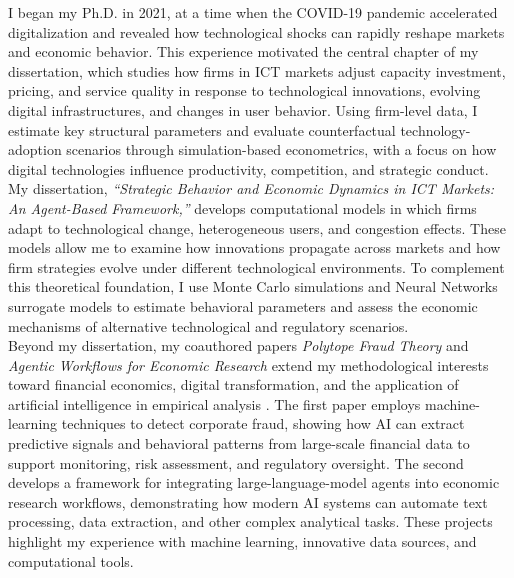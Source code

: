 \documentclass{nfr}
\begin{document}
I began my Ph.D. in 2021, at a time when the COVID-19 pandemic accelerated digitalization and revealed how technological shocks can rapidly reshape markets and economic behavior. 
This experience motivated the central chapter of my dissertation, which studies how firms in ICT markets adjust capacity investment, pricing, and service quality in response to technological innovations, evolving digital infrastructures, and changes in user behavior. 
Using firm-level data, I estimate key structural parameters and evaluate counterfactual technology-adoption scenarios through simulation-based econometrics, with a focus on how digital technologies influence productivity, competition, and strategic conduct.
My dissertation, \textit{“Strategic Behavior and Economic Dynamics in ICT Markets: An Agent-Based Framework,”} develops computational models in which firms adapt to technological change, heterogeneous users, and congestion effects. 
These models allow me to examine how innovations propagate across markets and how firm strategies evolve under different technological environments. 
To complement this theoretical foundation, I use Monte Carlo simulations and Neural Networks surrogate models to estimate behavioral parameters and assess the economic mechanisms of alternative technological and regulatory scenarios. \\

Beyond my dissertation, my coauthored papers \textit{Polytope Fraud Theory} and \textit{Agentic Workflows for Economic Research} extend my methodological interests toward financial economics, digital transformation, and the application of artificial intelligence in empirical analysis \citep{Zhao2025, Dawid2025}. 
The first paper employs machine-learning techniques to detect corporate fraud, showing how AI can extract predictive signals and behavioral patterns from large-scale financial data to support monitoring, risk assessment, and regulatory oversight. 
The second develops a framework for integrating large-language-model agents into economic research workflows, demonstrating how modern AI systems can automate text processing, data extraction, and other complex analytical tasks. 
These projects highlight my experience with machine learning, innovative data sources, and computational tools.\\
\end{document}
